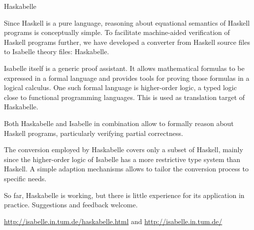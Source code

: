 \documentclass{article}
\begin{document}
\begin{hcarentry}{Haskabelle}
\makeheader

Since Haskell is a pure language, reasoning about equational semantics of Haskell programs is conceptually simple.  To facilitate machine-aided verification of Haskell programs further, we have developed a converter from Haskell source files to Isabelle theory files: Haskabelle.

Isabelle itself is a generic proof assistant.  It allows mathematical formulas to be expressed in a formal language and provides tools for proving those formulas in a logical calculus.  One such formal language is higher-order logic, a typed logic close to functional programming languages.  This is used as translation target of Haskabelle.

Both Haskabelle and Isabelle in combination allow to formally reason about Haskell programs, particularly verifying partial correctness.

The conversion employed by Haskabelle covers only a subset of Haskell, mainly since the higher-order logic of Isabelle has a more restrictive type system than Haskell.  A simple adaption mechanisms allows to tailor the conversion process to specific needs.

So far, Haskabelle is working, but there is little experience for its application in practice.  Suggestions and feedback welcome.

\FurtherReading
  \url{http://isabelle.in.tum.de/haskabelle.html}
  and \url{http://isabelle.in.tum.de/}
\end{hcarentry}
\end{document}

